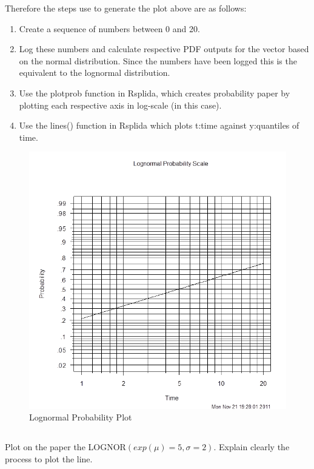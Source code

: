 \documentclass{article}
\begin{document}
Therefore the steps use to generate the plot above are as follows:\\
\begin{enumerate}
\item Create a sequence of numbers between 0 and 20.\\

\item Log these numbers and calculate respective PDF outputs for the vector based on the normal distribution.  Since the numbers have been logged this is the equivalent to the lognormal distribution.

\item Use the plotprob function in Rsplida, which creates probability paper by plotting each respective axis in log-scale (in this case).

\item Use the lines() function in Rsplida which plots t:time against y:quantiles of time.
\end{enumerate}


\begin{figure}
  \centering
  \includegraphics[width = 5in]{lognormal_graph_2.png}
  \caption{Lognormal Probability Plot}
\end{figure}
\FloatBarrier

\subsection{}
Plot on the paper the LOGNOR\begin{math}(exp(\mu) = 5, \sigma = 2).\end{math}
Explain clearly the process to plot the line.\\
\end{document}
